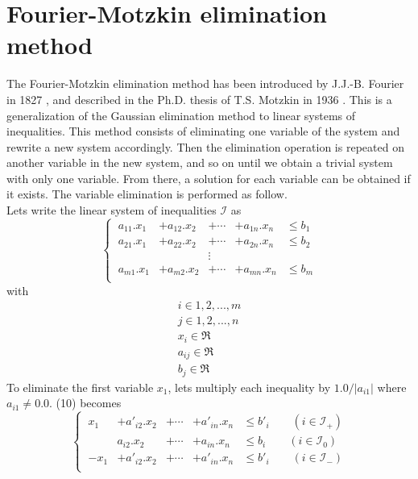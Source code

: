 \documentclass[12pt, a4paper]{article}
\begin{document}
\section{Fourier-Motzkin elimination method}

The Fourier-Motzkin elimination method has been introduced by J.J.-B. Fourier in 1827 \cite{fourier}, and described in the Ph.D. thesis of T.S. Motzkin in 1936 \cite{motzkin}. This is a generalization of the Gaussian elimination method to linear systems of inequalities. This method consists of eliminating one variable of the system and rewrite a new system accordingly. Then the elimination operation is repeated on another variable in the new system, and so on until we obtain a trivial system with only one variable. From there, a solution for each variable can be obtained if it exists. The variable elimination is performed as follow.\\
Lets write the linear system of inequalities $\mathcal{I}$ as 
\begin{equation}
\left\{\
\begin{array}{ccccc}
a_{11}.x_1&+a_{12}.x_2&+\cdots&+a_{1n}.x_n &\le b_1\\
a_{21}.x_1&+a_{22}.x_2&+\cdots&+a_{2n}.x_n &\le b_2\\
&&\vdots&&\\
a_{m1}.x_1&+a_{m2}.x_2&+\cdots&+a_{mn}.x_n &\le b_m\\
\end{array}
\right.
\end{equation}
with
\begin{equation}
\begin{array}{c}
i\in{1, 2, ..., m}\\
j\in{1, 2, ..., n}\\
x_i\in\Re\\
a_{ij}\in\Re\\
b_j\in\Re 
\end{array}
\end{equation}
To eliminate the first variable $x_1$, lets multiply each inequality by $1.0/|a_{i1}|$ where $a_{i1}\not=0.0$. (10) becomes
\begin{equation}
\left\{\
\begin{array}{ccccc}
x_1&+a'_{i2}.x_2&+\cdots&+a'_{in}.x_n &\le b'_i\qquad(i\in\mathcal{I}_+)\\
&a_{i2}.x_2&+\cdots&+a_{in}.x_n &\le b_i\qquad(i\in\mathcal{I}_0)\\
-x_1&+a'_{i2}.x_2&+\cdots&+a'_{in}.x_n &\le b'_i\qquad(i\in\mathcal{I}_-)\\
\end{array}
\right.
\end{equation}
\end{document}
